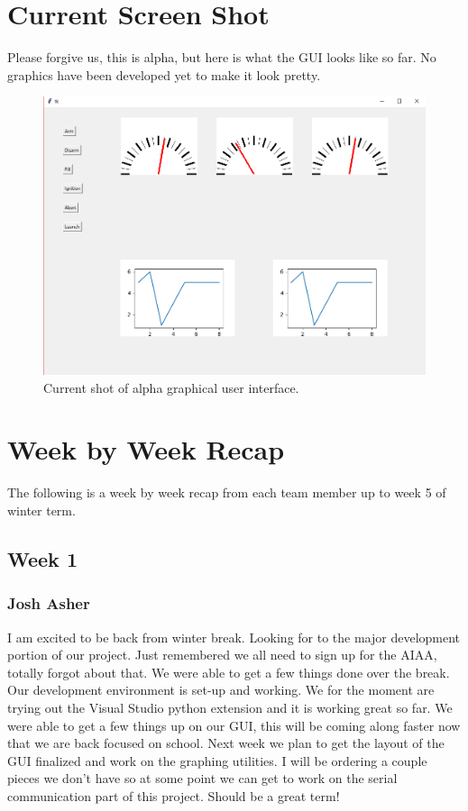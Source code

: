 \documentclass[10pt,draftclsnofoot,onecolumn]{IEEEtran}
\begin{document}
\section{Current Screen Shot}
Please forgive us, this is alpha, but here is what the GUI looks like so far. No graphics have been developed yet to make it look pretty. \par

\begin{figure}[!ht]
  \caption{Current shot of alpha graphical user interface.}
  \centering
	\includegraphics[scale=.85]{AlphaGui}
\end{figure}
\FloatBarrier

\section{Week by Week Recap}
The following is a week by week recap from each team member up to week 5 of winter term.  \par

\subsection{Week 1}
\subsubsection{Josh Asher}
 I am excited to be back from winter break. Looking for to the major development portion of our project. Just remembered we all need to sign up for the AIAA, totally forgot about that. We were able to get a few things done over the break. Our development environment is set-up and working. We for the moment are trying out the Visual Studio python extension and it is working great so far. We were able to get a few things up on our GUI, this will be coming along faster now that we are back focused on school. Next week we plan to get the layout of the GUI finalized and work on the graphing utilities. I will be ordering a couple pieces we don't have so at some point we can get to work on the serial communication part of this project. Should be a great term! \par
\end{document}
